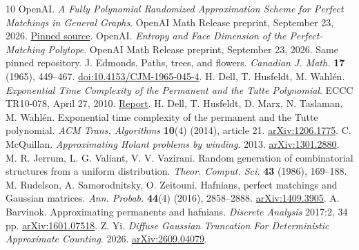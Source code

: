 \documentclass[11pt]{article}
\begin{document}
\begin{thebibliography}{10}
 OpenAI. \emph{A Fully Polynomial Randomized Approximation Scheme for Perfect Matchings in General Graphs}. OpenAI Math Release preprint, September 23, 2026. \href{https://github.com/openai/math/blob/adc7f1241b42e322a6451854ab7e4b4c146bf78a/preprints/A-Fully-Polynomial-Randomized-Approximation-Scheme-for-Perfect-Matchings-in-General-Graphs-September-23-2026/main.pdf}{Pinned source}.
 OpenAI. \emph{Entropy and Face Dimension of the Perfect-Matching Polytope}. OpenAI Math Release preprint, September 23, 2026. Same pinned repository.
 J. Edmonds. Paths, trees, and flowers. \emph{Canadian J. Math.} \textbf{17} (1965), 449--467. \href{https://doi.org/10.4153/CJM-1965-045-4}{doi:10.4153/CJM-1965-045-4}.
 H. Dell, T. Husfeldt, M. Wahl\'en. \emph{Exponential Time Complexity of the Permanent and the Tutte Polynomial}. ECCC TR10-078, April 27, 2010. \href{https://eccc.weizmann.ac.il/report/2010/078/}{Report}.
 H. Dell, T. Husfeldt, D. Marx, N. Taslaman, M. Wahl\'en. Exponential time complexity of the permanent and the Tutte polynomial. \emph{ACM Trans. Algorithms} \textbf{10}(4) (2014), article 21. \href{https://arxiv.org/abs/1206.1775}{arXiv:1206.1775}.
 C. McQuillan. \emph{Approximating Holant problems by winding}. 2013. \href{https://arxiv.org/abs/1301.2880}{arXiv:1301.2880}.
 M. R. Jerrum, L. G. Valiant, V. V. Vazirani. Random generation of combinatorial structures from a uniform distribution. \emph{Theor. Comput. Sci.} \textbf{43} (1986), 169--188.
 M. Rudelson, A. Samorodnitsky, O. Zeitouni. Hafnians, perfect matchings and Gaussian matrices. \emph{Ann. Probab.} \textbf{44}(4) (2016), 2858--2888. \href{https://arxiv.org/abs/1409.3905}{arXiv:1409.3905}.
 A. Barvinok. Approximating permanents and hafnians. \emph{Discrete Analysis} 2017:2, 34 pp. \href{https://arxiv.org/abs/1601.07518}{arXiv:1601.07518}.
 Z. Yi. \emph{Diffuse Gaussian Truncation For Deterministic Approximate Counting}. 2026. \href{https://arxiv.org/abs/2609.04079}{arXiv:2609.04079}.
\end{thebibliography}
\end{document}
